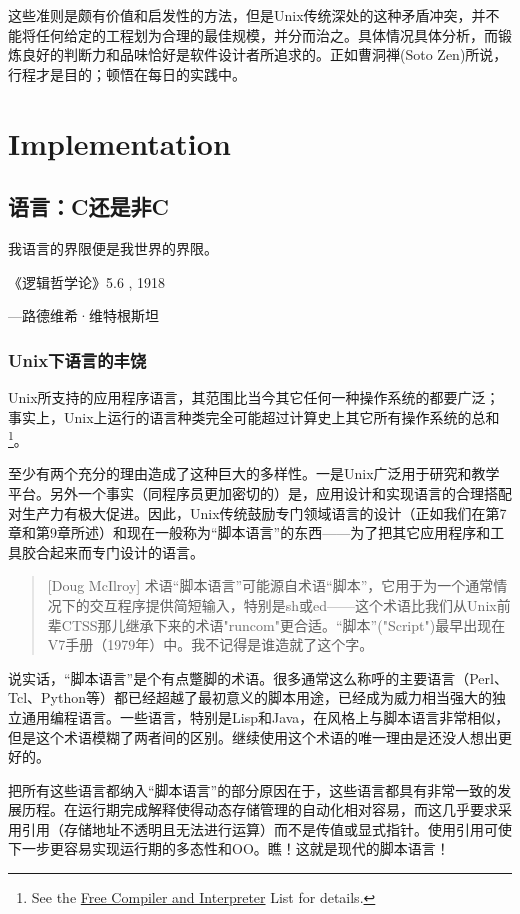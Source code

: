 \documentclass[12pt,oneside]{book}
\begin{document}
这些准则是颇有价值和启发性的方法，但是Unix传统深处的这种矛盾冲突，并不能将任何给定的工程划为合理的最佳规模，并分而治之。具体情况具体分析，而锻炼良好的判断力和品味恰好是软件设计者所追求的。正如曹洞禅(Soto Zen)所说，行程才是目的；顿悟在每日的实践中。


\part{Implementation}
\chapter{语言：C还是非C}
\begin{flushright}
我语言的界限便是我世界的界限。

{\hfill 《逻辑哲学论》5.6 , 1918}

{\hfill —路德维希·维特根斯坦}
\end{flushright}

\section{Unix下语言的丰饶}
Unix所支持的应用程序语言，其范围比当今其它任何一种操作系统的都要广泛；事实上，Unix上运行的语言种类完全可能超过计算史上其它所有操作系统的总和\footnote{See the \href{ftp://ftp.idiom.com/pub/compilers-list/free-compilers}{Free Compiler and Interpreter} List for details.}。

至少有两个充分的理由造成了这种巨大的多样性。一是Unix广泛用于研究和教学平台。另外一个事实（同程序员更加密切的）是，应用设计和实现语言的合理搭配对生产力有极大促进。因此，Unix传统鼓励专门领域语言的设计（正如我们在第7章和第9章所述）和现在一般称为“脚本语言”的东西——为了把其它应用程序和工具胶合起来而专门设计的语言。

\begin{quote}[Doug McIlroy]
术语“脚本语言”可能源自术语“脚本”，它用于为一个通常情况下的交互程序提供简短输入，特别是sh或ed——这个术语比我们从Unix前辈CTSS那儿继承下来的术语"runcom"更合适。“脚本”("Script")最早出现在V7手册（1979年）中。我不记得是谁造就了这个字。
\end{quote}

说实话，“脚本语言”是个有点蹩脚的术语。很多通常这么称呼的主要语言（Perl、Tcl、Python等）都已经超越了最初意义的脚本用途，已经成为威力相当强大的独立通用编程语言。一些语言，特别是Lisp和Java，在风格上与脚本语言非常相似，但是这个术语模糊了两者间的区别。继续使用这个术语的唯一理由是还没人想出更好的。

把所有这些语言都纳入“脚本语言”的部分原因在于，这些语言都具有非常一致的发展历程。在运行期完成解释使得动态存储管理的自动化相对容易，而这几乎要求采用引用（存储地址不透明且无法进行运算）而不是传值或显式指针。使用引用可使下一步更容易实现运行期的多态性和OO。瞧！这就是现代的脚本语言！
\end{document}
